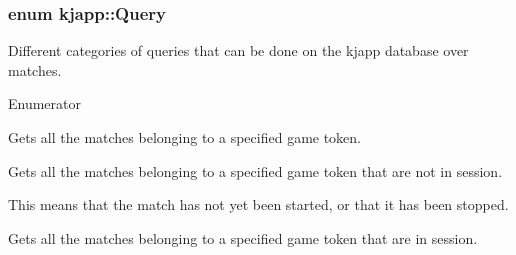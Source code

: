 \subsubsection[{\texorpdfstring{Query}{Query}}]{\setlength{\rightskip}{0pt plus 5cm}enum {\bf kjapp\+::\+Query}\hspace{0.3cm}{\ttfamily [strong]}}\hypertarget{namespacekjapp_a98b9b721617fe3ae75dd6f92507d2121}{}\label{namespacekjapp_a98b9b721617fe3ae75dd6f92507d2121}


Different categories of queries that can be done on the kjapp database over matches. 

\begin{Desc}
\item[Enumerator]\par
\begin{description}
\item[{\em 
A\+L\+L\+\_\+\+M\+A\+T\+C\+H\+ES\hypertarget{namespacekjapp_a98b9b721617fe3ae75dd6f92507d2121a446d73d3d33c027a52dea354cbb89f6a}{}\label{namespacekjapp_a98b9b721617fe3ae75dd6f92507d2121a446d73d3d33c027a52dea354cbb89f6a}
}]Gets all the matches belonging to a specified game token. \item[{\em 
N\+O\+T\+\_\+\+I\+N\+\_\+\+S\+E\+S\+S\+I\+ON\hypertarget{namespacekjapp_a98b9b721617fe3ae75dd6f92507d2121a18a470572636e1681c90bcfd186c90d1}{}\label{namespacekjapp_a98b9b721617fe3ae75dd6f92507d2121a18a470572636e1681c90bcfd186c90d1}
}]Gets all the matches belonging to a specified game token that are not in session.

This means that the match has not yet been started, or that it has been stopped. \item[{\em 
I\+N\+\_\+\+S\+E\+S\+S\+I\+ON\hypertarget{namespacekjapp_a98b9b721617fe3ae75dd6f92507d2121adb763e1606844ad7b28517112f999292}{}\label{namespacekjapp_a98b9b721617fe3ae75dd6f92507d2121adb763e1606844ad7b28517112f999292}
}]Gets all the matches belonging to a specified game token that are in session.


\end{description}
\end{Desc}
